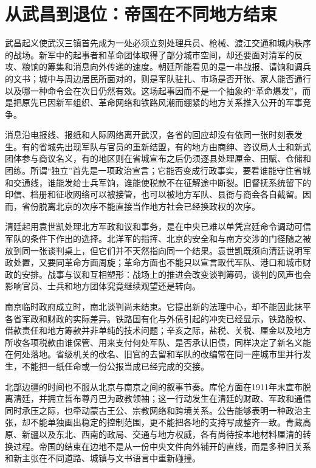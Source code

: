 \section{从武昌到退位：帝国在不同地方结束}

武昌起义使武汉三镇首先成为一处必须立刻处理兵员、枪械、渡江交通和城内秩序的战场。新军中的起事者和革命团体取得了部分城市空间，却还要面对清军的反攻、粮饷的筹集和消息向外传递的速度。朝廷所能看见的是一串战报、请饷和调兵的文书；城中与周边居民所面对的，则是军队驻扎、市场是否开张、家人能否通行以及哪一种命令会在次日仍然有效。这场起事因而不是一个抽象的“革命爆发”，而是把原先已因新军组织、革命网络和铁路风潮而绷紧的地方关系推入公开的军事竞争。

消息沿电报线、报纸和人际网络离开武汉，各省的回应却没有依同一张时刻表发生。有的省城先出现军队与官员的重新结盟，有的地方由商绅、咨议局人士和新式团体参与商议名义，有的地区则在省城宣布之后仍须逐县处理厘金、田赋、仓储和团练。所谓“独立”首先是一项政治宣言；它能否变成行政事实，要看谁能守住省城和交通线，谁能发给士兵军饷，谁能使税款不在征解途中断裂。旧督抚系统留下的印信、档册和征收网络可以被接管，也可以被地方军队、县衙与商会各自截留。因而，省份脱离北京的次序不能直接当作地方社会已经换政权的次序。

清廷起用袁世凯处理北方军政和议和事务，是在中央已难以单凭宫廷命令调动可信军队的条件下作出的选择。北洋军的指挥、北京的安全和与南方交涉的门径随之被放到同一张谈判桌上，但它们并不天然指向同一个结果。袁世凯既须向清廷说明军政处置，又要同革命方面周旋；革命方面也不能只以宣言取代军队、港口和城市财政的安排。战事与议和互相塑形：战场上的推进会改变谈判筹码，谈判的风声也会影响官员、士兵和地方团体究竟继续观望还是转向。

南京临时政府成立时，南北谈判尚未结束。它提出新的法理中心，却不能因此抹平各省军政和财政的实际差异。铁路国有化与外债引起的冲突已经显示，铁路股权、借款责任和地方筹款并非单纯的技术问题；辛亥之际，盐税、关税、厘金以及地方所收各项税款由谁保管、用来支付何处军队、是否承认旧债，同样决定了新名义能在何处落地。省级机关的改名、旧官的去留和军队的改编常在同一座城市里并行发生，不能把一纸任命或一份公报当成已经完成的交接。

北部边疆的时间也不服从北京与南京之间的叙事节奏。库伦方面在1911年末宣布脱离清廷，并拥立哲布尊丹巴为政教领袖；这一行动发生在清廷的财政、军政和通信同时承压之际，也牵动蒙古王公、宗教网络和跨境关系。公告能够表明一种政治主张，却不能单独画出稳定的控制范围，更不能把各地的支持写成整齐一致。青藏高原、新疆以及东北、西南的政局、交通与地方权威，各有尚待按本地材料厘清的转换过程。帝国的结束在边地不是从一份中央文件向外铺开的直线，而是多种旧关系和新主张在不同道路、城镇与文书语言中重新碰撞。


